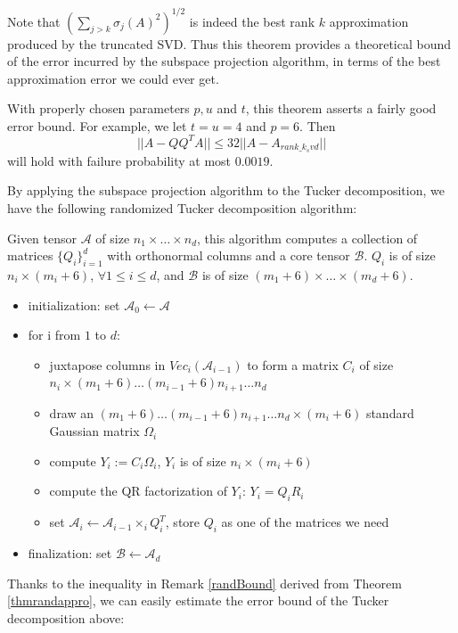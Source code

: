 \documentclass[12pt]{article}
\begin{document}
Note that $(\sum_{j > k} \sigma_j(A)^2)^{1/2}$ is indeed the best rank $k$ approximation produced by the truncated SVD. Thus this theorem provides a theoretical bound of the error incurred by the subspace projection algorithm, in terms of the best approximation error we could ever get.
\begin{myrmk}
\label{randBound}
With properly chosen parameters $p, u$ and $t$, this theorem asserts a fairly good error bound. For example, we let $t = u = 4$ and $p = 6$. Then
$$ || A - QQ^TA|| \leq 32 || A - A_{rank\_k_svd} || $$
will hold with failure probability at most $0.0019$.
\end{myrmk}

By applying the subspace projection algorithm to the Tucker decomposition, we have the following randomized Tucker decomposition algorithm:

\begin{myalgo}
Given tensor $\mathcal{A}$ of size $n_1 \times \dots \times n_d$, this algorithm computes a collection of matrices $\{Q_i\}_{i = 1}^d$ with orthonormal columns and a core tensor $\mathcal{B}$. $Q_i$ is of size $n_i \times (m_i + 6)$, $\forall 1 \leq i \leq d$, and $\mathcal{B}$ is of size $(m_1 + 6)  \times \dots \times (m_d + 6)$.
\begin{itemize}
\item initialization: set $\mathcal{A}_0 \leftarrow \mathcal{A}$
\item for i from $1$ to $d$:
	\begin{itemize}
		\item juxtapose columns in $Vec_i(\mathcal{A}_{i-1})$ to form a matrix $C_i$ of size $n_i \times (m_1+6) \dots (m_{i-1}+6)  n_{i+1} \dots n_d $
		\item draw an $(m_1+6) \dots (m_{i-1}+6)  n_{i+1} \dots n_d \times (m_i + 6)$ standard Gaussian matrix $\Omega_i$
		\item compute $Y_i := C_i \Omega_i$, $Y_i$ is of size $n_i \times (m_i + 6)$
		\item compute the QR factorization of $Y_i$: $Y_i = Q_i R_i$
		\item set $\mathcal{A}_i \leftarrow \mathcal{A}_{i-1} \times_i Q_i^T$, store $Q_i$ as one of the matrices we need
	\end{itemize}
\item finalization: set $\mathcal{B} \leftarrow \mathcal{A}_d$
\end{itemize}
\end{myalgo}

Thanks to the inequality in Remark \ref{randBound} derived from Theorem \ref{thmrandappro}, we can easily estimate the error bound of the Tucker decomposition above:
\end{document}
